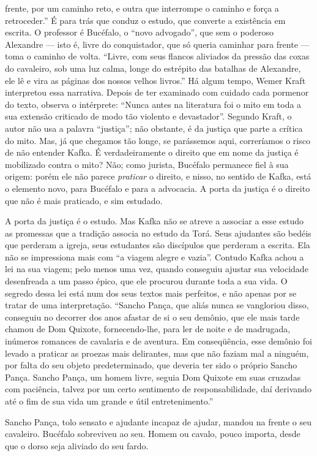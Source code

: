 frente, por um caminho reto, e outra que interrompe o caminho e força a
retroceder.'' É para trás que conduz o estudo, que converte a existência
em escrita. O professor é Bucéfalo, o ``novo advogado'', que sem o
poderoso Alexandre --- isto é, livre do conquistador, que só queria
caminhar para frente --- toma o caminho de volta. ``Livre, com seus
flancos aliviados da pressão das coxas do cavaleiro, sob uma luz calma,
longe do estrépito das batalhas de Alexandre, ele lê e vira as páginas
dos nossos velhos livros.'' Há algum tempo, Wemer Kraft interpretou essa
narrativa. Depois de ter examinado com cuidado cada pormenor do texto,
observa o intérprete: ``Nunca antes na literatura foi o mito em toda a
sua extensão criticado de modo tão violento e devastador''. Segundo
Kraft, o autor não usa a palavra ``justiça''; não obstante, é da justiça
que parte a crítica do mito. Mas, já que chegamos tão longe, se
parássemos aqui, correríamos o risco de não entender Kafka. É
verdadeiramente o direito que em nome da justiça é mobilizado contra o
mito? Não; como jurista, Bucéfalo permanece fiel à sua origem: porém ele
não parece \textit{praticar} o direito, e nisso, no sentido de Kafka, está o
elemento novo, para Bucéfalo e para a advocacia. A porta da justiça é o
direito que não é mais praticado, e sim estudado.

A porta da justiça é o estudo. Mas Kafka não se atreve a associar a esse
estudo as promessas que a tradição associa no estudo da Torá. Seus
ajudantes são bedéis que perderam a igreja, seus estudantes são
discípulos que perderam a escrita. Ela não se impressiona mais com ``a
viagem alegre e vazia''. Contudo Kafka achou a lei na sua viagem; pelo
menos uma vez, quando conseguiu ajustar sua velocidade desenfreada a um
passo épico, que ele procurou durante toda a sua vida. O segredo dessa
lei está num dos seus textos mais perfeitos, e não apenas por se tratar
de uma interpretação. ``Sancho Pança, que aliás nunca se vangloriou
disso, conseguiu no decorrer dos anos afastar de si o seu demônio, que
ele mais tarde chamou de Dom Quixote, fornecendo-lhe, para ler de noite
e de madrugada, inúmeros romances de cavalaria e de aventura. Em
conseqüência, esse demônio foi levado a praticar as proezas mais
delirantes, mas que não faziam mal a ninguém, por falta do seu objeto
predeterminado, que deveria ter sido o próprio Sancho Pança. Sancho
Pança, um homem livre, seguia Dom Quixote em suas cruzadas com
paciência, talvez por um certo sentimento de responsabilidade, daí
derivando até o fim de sua vida um grande e útil entretenimento.''

Sancho Pança, tolo sensato e ajudante incapaz de ajudar, mandou na
frente o seu cavaleiro. Bucéfalo sobreviveu ao seu. Homem ou cavalo,
pouco importa, desde que o dorso seja aliviado do seu fardo.
